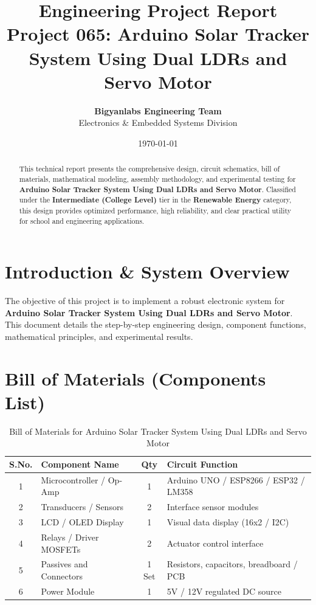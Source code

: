 \documentclass[11pt,a4paper]{article}
\title{\textbf{\Huge Engineering Project Report}\\[0.5em] \Large Project 065: Arduino Solar Tracker System Using Dual LDRs and Servo Motor}
\author{\textbf{Bigyanlabs Engineering Team}\\ Electronics \& Embedded Systems Division}
\date{\today}
\begin{document}
\maketitle
\thispagestyle{empty}

\begin{abstract}
This technical report presents the comprehensive design, circuit schematics, bill of materials, mathematical modeling, assembly methodology, and experimental testing for \textbf{Arduino Solar Tracker System Using Dual LDRs and Servo Motor}. Classified under the \textbf{Intermediate (College Level)} tier in the \textbf{Renewable Energy} category, this design provides optimized performance, high reliability, and clear practical utility for school and engineering applications.
\end{abstract}

\newpage
\tableofcontents
\newpage

\section{Introduction \& System Overview}
The objective of this project is to implement a robust electronic system for \textbf{Arduino Solar Tracker System Using Dual LDRs and Servo Motor}. This document details the step-by-step engineering design, component functions, mathematical principles, and experimental results.

\section{Bill of Materials (Components List)}
\begin{table}[h!]
\centering
\caption{Bill of Materials for Arduino Solar Tracker System Using Dual LDRs and Servo Motor}
\vspace{0.5em}
\begin{tabular}{clcp{7cm}}
\toprule
\textbf{S.No.} & \textbf{Component Name} & \textbf{Qty} & \textbf{Circuit Function} \\
\midrule
1 & Microcontroller / Op-Amp & 1 & Arduino UNO / ESP8266 / ESP32 / LM358 \\
2 & Transducers / Sensors & 2 & Interface sensor modules \\
3 & LCD / OLED Display & 1 & Visual data display (16x2 / I2C) \\
4 & Relays / Driver MOSFETs & 2 & Actuator control interface \\
5 & Passives and Connectors & 1 Set & Resistors, capacitors, breadboard / PCB \\
6 & Power Module & 1 & 5V / 12V regulated DC source \\
\bottomrule
\end{tabular}
\end{table}
\end{document}

